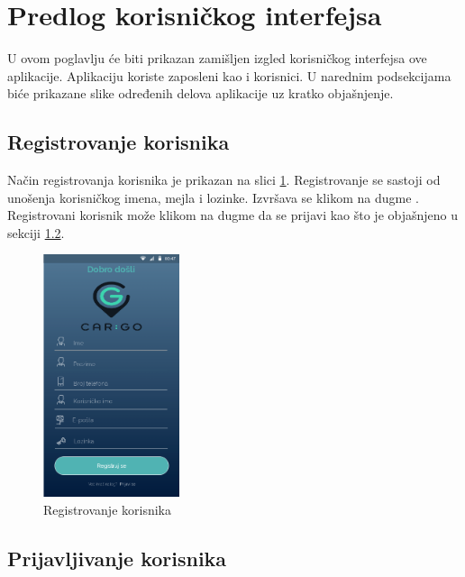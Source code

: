 \section{\bfseries Predlog korisničkog interfejsa}

U ovom poglavlju će biti prikazan zamišljen izgled korisničkog interfejsa ove aplikacije. Aplikaciju koriste zaposleni kao i korisnici. U narednim podsekcijama biće prikazane slike određenih delova aplikacije uz kratko objašnjenje.

\subsection{\bfseries Registrovanje korisnika}

Način registrovanja korisnika je prikazan na slici \ref{fig:Registrovanje korisnika}. Registrovanje se sastoji od unošenja korisničkog imena, mejla i lozinke.  Izvršava se klikom na dugme . Registrovani korisnik može klikom na dugme  da se prijavi kao što je objašnjeno u sekciji \ref{Prijavljivanje_korisnika_sekcija}.

\begin{figure}[H]
\begin{center}
\includegraphics[width=4cm]{Slike/Registrovanje.png}
\end{center}
    \caption{Registrovanje korisnika}
\label{fig:Registrovanje korisnika}
\end{figure}

\subsection{\bfseries Prijavljivanje korisnika}
\label{Prijavljivanje_korisnika_sekcija}


